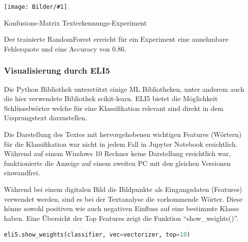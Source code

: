 \documentclass[
  12pt, %
  a4paper, %
  oneside, %
  openany, 
  numbers=noenddot, %
  BCOR=5mm, %
  parskip=half*, %
  thesis, %
]{bfhbook}
\newcommand{\imgText}[3]{
\begin{center}
    \begin{minipage}[t]{0.6\textwidth}
    		\vspace{0pt}
		\texttt{[image: Bilder/\#1]}
		\caption{#2}
	\end{minipage}\hfill
    \begin{minipage}[t]{0.4\textwidth}
    		\vspace{5pt}
  		#3
    \end{minipage}
\end{center}
}
\begin{document}
\imgText{MovieReviews-SentimentClassification_ConfMatrix.PNG}{Konfusions-Matrix Texterkennungs-Experiment}{
Der trainierte RandomForest erreicht für ein Experiment eine annehmbare Fehlerquote und eine Accuracy von 0.86.
}

\subsubsection*{Visualisierung durch ELI5}
Die Python Bibliothek \cite{ELI5} unterstützt einige \gls{ML} Bibliotheken, unter anderem auch die hier verwendete Bibliothek scikit-learn. ELI5 bietet die Möglichkeit Schlüsselwörter welche für eine Klassifikation relevant sind direkt in dem Ursprungstext darzustellen. 

\begin{myboxi}
Die Darstellung des Textes mit hervorgehobenen wichtigen Features (Wörtern) für die Klassifikation war nicht in jedem Fall in Jupyter Notebook ersichtlich. Während auf einem Windows 10 Rechner keine Darstellung ersichtlich war, funktionierte die Anzeige auf einem zweiten PC mit den gleichen Versionen einwandfrei.
\end{myboxi}
 \break
 \break
Während bei einem digitalen Bild die Bildpunkte als Eingangsdaten (Features) verwendet werden, sind es bei der Textanalyse die vorkommende Wörter. Diese könne sowohl positiven wie auch negativen Einfluss auf eine bestimmte Klasse haben. Eine Übersicht der Top Features zeigt die Funktion ``show\_weights()''.
\begin{lstlisting}[language=Python]
eli5.show_weights(classifier, vec=vectorizer, top=10)
\end{lstlisting}
\end{document}
